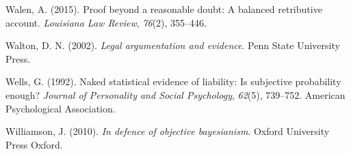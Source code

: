 \documentclass[11pt,dvipsnames,enabledeprecatedfontcommands]{scrartcl}
\begin{document}
\hypertarget{ref-walen2015}{}
Walen, A. (2015). Proof beyond a reasonable doubt: A balanced
retributive account. \emph{Louisiana Law Review}, \emph{76}(2),
355--446.

\hypertarget{ref-Walton2002}{}
Walton, D. N. (2002). \emph{Legal argumentation and evidence}. Penn
State University Press.

\hypertarget{ref-wells1992naked}{}
Wells, G. (1992). Naked statistical evidence of liability: Is subjective
probability enough? \emph{Journal of Personality and Social Psychology},
\emph{62}(5), 739--752. American Psychological Association.

\hypertarget{ref-williamson2010defence}{}
Williamson, J. (2010). \emph{In defence of objective bayesianism}.
Oxford University Press Oxford.
\end{document}
